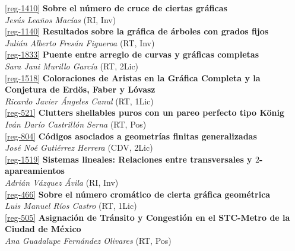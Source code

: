 \begin{multicols}{2}
\noindent  \ref{reg-1410}  {\bfseries Sobre el n\'umero de cruce de ciertas gr\'aficas}\\
{\slshape  Jes\'us  Lea\~nos Mac\'ias} {\footnotesize (RI, Inv)}\\

\noindent  \ref{reg-1140}  {\bfseries Resultados sobre la gr\'afica de \'arboles con grados fijos}\\
{\slshape  Juli\'an Alberto Fres\'an Figueroa} {\footnotesize (RT, Inv)}\\

\noindent  \ref{reg-1833}  {\bfseries Puente entre arreglo de curvas y gr\'aficas completas}\\
{\slshape  Sara Jani Murillo Garc\'ia} {\footnotesize (RT, 2Lic)}\\

\noindent  \ref{reg-1518}  {\bfseries Coloraciones de Aristas en la Gr\'afica Completa y la Conjetura de Erd\"os, Faber y L\'ovasz}\\
{\slshape  Ricardo Javier \'Angeles Canul} {\footnotesize (RT, 1Lic)}\\

\noindent  \ref{reg-521}  {\bfseries Clutters shellables puros con un pareo perfecto tipo K\"onig}\\
{\slshape  Iv\'an Dar\'io Castrill\'on Serna} {\footnotesize (RT, Pos)}\\

\noindent  \ref{reg-804}  {\bfseries C\'odigos asociados a geometr\'ias finitas generalizadas}\\
{\slshape  Jos\'e No\'e Guti\'errez Herrera} {\footnotesize (CDV, 2Lic)}\\

\noindent  \ref{reg-1519}  {\bfseries Sistemas lineales: Relaciones entre transversales y $2$-apareamientos}\\
{\slshape  Adri\'an  V\'azquez \'Avila} {\footnotesize (RI, Inv)}\\

\noindent  \ref{reg-466}  {\bfseries Sobre el n\'umero crom\'atico de cierta gr\'afica geom\'etrica}\\
{\slshape  Luis Manuel R\'ios Castro} {\footnotesize (RT, 1Lic)}\\

\noindent  \ref{reg-505}  {\bfseries Asignaci\'on de Tr\'ansito y Congesti\'on en el STC-Metro de la Ciudad de M\'exico}\\
{\slshape  Ana Guadalupe Fern\'andez Olivares} {\footnotesize (RT, Pos)}\\


\end{multicols}

